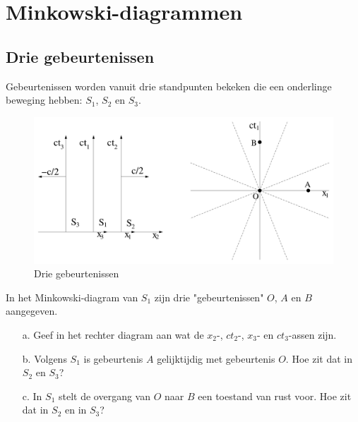 \section{Minkowski-diagrammen}


\subsection{Drie gebeurtenissen}
Gebeurtenissen worden vanuit drie standpunten bekeken die een onderlinge 
beweging hebben: $S_{1}$, $S_{2}$ en $S_{3}$. 


\begin{figure}[ht]
\centering
\includegraphics[width=.8\textwidth]{oefeningen.pictures/oef_4/oef4-1}
\caption{Drie gebeurtenissen}
\label{f:oef4-1}
\end{figure}  

In het Minkowski-diagram van $S_{1}$ zijn drie "gebeurtenissen" $O$, $A$ en $B$
aangegeven. 
\begin{itemize}
\item [a.]
  Geef in het rechter diagram aan wat de $x_{2}$-, $ct_{2}$-, $x_{3}$- en
  $ct_{3}$-assen zijn. 
\item  [b.]
  Volgens $S_{1}$ is gebeurtenis $A$ gelijktijdig met gebeurtenis $O$. 
Hoe zit dat in $S_{2}$ en $S_{3}$? 
\item [c.]
  In  $S_{1}$ stelt de overgang van $O$ naar $B$ een toestand van rust voor. 
Hoe zit dat in $S_{2}$ en in $S_{3}$? 
\end{itemize}

